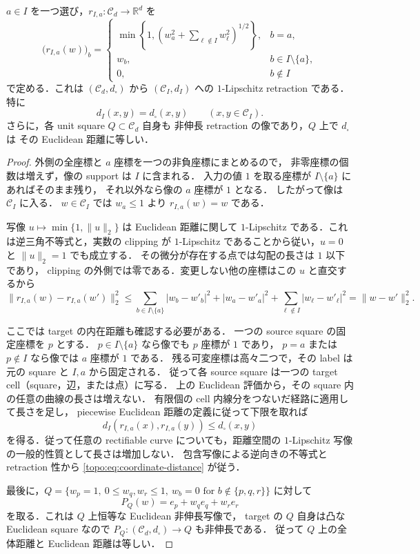 \begin{proposition}
\label{topo:coordinate-retraction}
$a\in I$ を一つ選び，$r_{I,a}:\mathcal C_d\to\mathbb R^d$ を
\[
 \bigl(r_{I,a}(w)\bigr)_b=
 \begin{cases}
  \min\!\left\{1,
   \left(w_a^2+\displaystyle\sum_{\ell\notin I}w_\ell^2\right)^{1/2}
       \right\},&b=a,\\
  w_b,&b\in I\setminus\{a\},\\
  0,&b\notin I
 \end{cases}
\]
で定める．これは $(\mathcal C_d,d_\square)$ から
$(\mathcal C_I,d_I)$ への $1$-Lipschitz retraction である．特に
\begin{equation}\label{topo:eq:coordinate-distance}
 d_I(x,y)=d_\square(x,y)\qquad(x,y\in\mathcal C_I).
\end{equation}
さらに，各 unit square $Q\subset\mathcal C_d$ 自身も
非伸長 retraction の像であり，$Q$ 上で $d_\square$ は
その Euclidean 距離に等しい．
\end{proposition}
\begin{proof}
外側の全座標と $a$ 座標を一つの非負座標にまとめるので，
非零座標の個数は増えず，像の support は $I$ に含まれる．
入力の値 $1$ を取る座標が $I\setminus\{a\}$ にあればそのまま残り，
それ以外なら像の $a$ 座標が $1$ となる．
したがって像は $\mathcal C_I$ に入る．
$w\in\mathcal C_I$ では $w_a\le1$ より $r_{I,a}(w)=w$ である．

写像 $u\mapsto\min\{1,\|u\|_2\}$ は Euclidean 距離に関して
$1$-Lipschitz である．これは逆三角不等式と，実数の clipping が
$1$-Lipschitz であることから従い，$u=0$ と $\|u\|_2=1$ でも成立する．
その微分が存在する点では勾配の長さは $1$ 以下であり，
clipping の外側では零である．変更しない他の座標はこの $u$ と直交するから
\[
 \|r_{I,a}(w)-r_{I,a}(w')\|_2^2
 \le\sum_{b\in I\setminus\{a\}}|w_b-w'_b|^2
       +|w_a-w'_a|^2+\sum_{\ell\notin I}|w_\ell-w'_\ell|^2
 =\|w-w'\|_2^2.
\]

ここでは target の内在距離も確認する必要がある．
一つの source square の固定座標を $p$ とする．
$p\in I\setminus\{a\}$ なら像でも $p$ 座標が $1$ であり，
$p=a$ または $p\notin I$ なら像では $a$ 座標が $1$ である．
残る可変座標は高々二つで，その label は元の square と $I,a$ から固定される．
従って各 source square は一つの target cell（square，辺，または点）に写る．
上の Euclidean 評価から，その square 内の任意の曲線の長さは増えない．
有限個の cell 内線分をつないだ経路に適用して長さを足し，
piecewise Euclidean 距離の定義に従って下限を取れば
\[
 d_I(r_{I,a}(x),r_{I,a}(y))\le d_\square(x,y)
\]
を得る．従って任意の rectifiable curve についても，距離空間の
$1$-Lipschitz 写像の一般的性質として長さは増加しない．
包含写像による逆向きの不等式と retraction 性から
\eqref{topo:eq:coordinate-distance} が従う．

最後に，$Q=\{w_p=1,\ 0\le w_q,w_r\le1,\ w_b=0
\text{ for }b\notin\{p,q,r\}\}$ に対して
\[
 P_Q(w)=e_p+w_qe_q+w_re_r
\]
を取る．これは $Q$ 上恒等な Euclidean 非伸長写像で，
target の $Q$ 自身は凸な Euclidean square なので
$P_Q:(\mathcal C_d,d_\square)\to Q$ も非伸長である．
従って $Q$ 上の全体距離と Euclidean 距離は等しい．
\end{proof}

